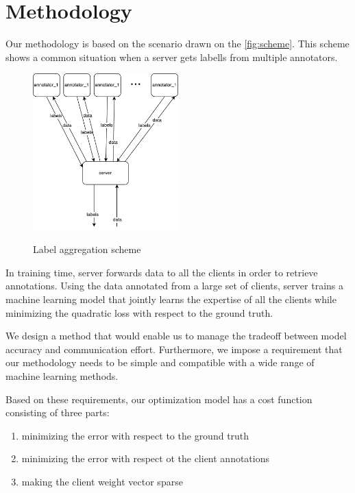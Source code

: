\documentclass{llncs}
\begin{document}
\section{Methodology}

Our methodology is based on the scenario drawn on the \autoref{fig:scheme}. This scheme shows a common situation when a server gets labells from multiple annotators. 

\begin{figure}
  \caption{Label aggregation scheme}
  \centering
    \includegraphics[width=0.5\textwidth]{figures/lowbudget.pdf}
  \label{fig:scheme}
\end{figure}

In training time, server forwards data to all the clients in order to retrieve annotations. Using the data annotated from a large set of clients, server trains a machine learning model that jointly learns the expertise of all the clients while minimizing the quadratic loss with respect to the ground truth.  

We design a method that would enable us to manage the tradeoff between model accuracy and communication effort. Furthermore, we impose a requirement that our methodology needs to be simple and compatible with a wide range of machine learning methods. 

Based on these requirements, our optimization model has a cost function consisting of three parts:

\begin{enumerate}
\item minimizing the error with respect to the ground truth
\item minimizing the error with respect ot the client annotations
\item making the client weight vector sparse 
\end{enumerate}
\end{document}
